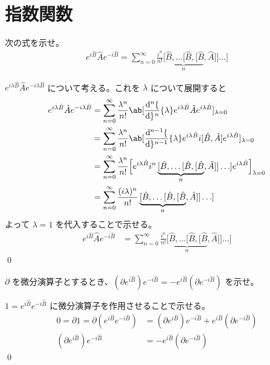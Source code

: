 \documentclass[uplatex,dvipdfmx,a4paper,11pt]{jlreq}
\makeatletter
\numberwithin{equation}{section}
\theoremstyle{definition}
\renewenvironment{proof}[1][\proofname]{\par
  \normalfont
  \topsep6\p@\@plus6\p@ \trivlist
  \item[\hskip\labelsep{\bfseries #1}\@addpunct{\bfseries}]\ignorespaces\quad\par
}{%
  \qed\endtrivlist\@endpefalse
}
\renewcommand\proofname{証明}
\makeatother
\begin{document}
\section{指数関数}
\renewcommand{\AA}{\hat{A}}
\newcommand{\BB}{\hat{B}}
\begin{problem}
次の式を示せ。
\begin{align}
  e^{i\BB}\AA e^{-i\BB} = \sum_{n=0}^{\infty}\frac{i^n}{n!}\underbrace{[\BB, \ldots [\BB, [\BB}_{n}, \AA]] \ldots]
\end{align}
\end{problem}
\begin{proof}
  $e^{i\lambda\BB}\AA e^{-i\lambda\BB}$ について考える。これを $\lambda$ について展開すると
  \begin{align}
    e^{i\lambda\BB}\AA e^{-i\lambda\BB} & = \sum_{n=0}^{\infty}\frac{\lambda^n}{n!}\ab[\diff[n]{}{\lambda}e^{i\lambda\BB}\AA e^{i\lambda\BB}]_{\lambda = 0}                                         \\
                                        & = \sum_{n=0}^{\infty}\frac{\lambda^n}{n!}\ab[\diff[n-1]{}{\lambda}e^{i\lambda\BB}i[\BB, \AA]e^{i\lambda\BB}]_{\lambda = 0}                                \\
                                        & = \sum_{n=0}^{\infty}\frac{\lambda^n}{n!}\Big[e^{i\lambda\BB}i^n\underbrace{[\BB, \ldots [\BB, [\BB}_{n}, \AA]] \ldots]e^{i\lambda\BB}\Big]_{\lambda = 0} \\
                                        & = \sum_{n=0}^{\infty}\frac{(i\lambda)^n}{n!}\underbrace{[\BB, \ldots [\BB, [\BB}_{n}, \AA]] \ldots]
  \end{align}
  よって $\lambda = 1$ を代入することで示せる。
  \begin{align}
    e^{i\BB}\AA e^{-i\BB} & = \sum_{n=0}^{\infty}\frac{i^n}{n!}\underbrace{[\BB, \ldots [\BB, [\BB}_{n}, \AA]] \ldots]
  \end{align}
\end{proof}

\begin{problem}
$\partial$ を微分演算子とするとき、$(\partial e^{i\BB})e^{-i\BB} = -e^{i\BB}(\partial e^{-i\BB})$ を示せ。
\end{problem}
\begin{proof}
  $1 = e^{i\BB}e^{-i\BB}$ に微分演算子を作用させることで示せる。
  \begin{align}
    0 = \partial 1 = \partial(e^{i\BB}e^{-i\BB}) & = (\partial e^{i\BB})e^{-i\BB} + e^{i\BB}(\partial e^{-i\BB}) \\
    (\partial e^{i\BB})e^{-i\BB}                 & = -e^{i\BB}(\partial e^{-i\BB})
  \end{align}
\end{proof}
\end{document}
